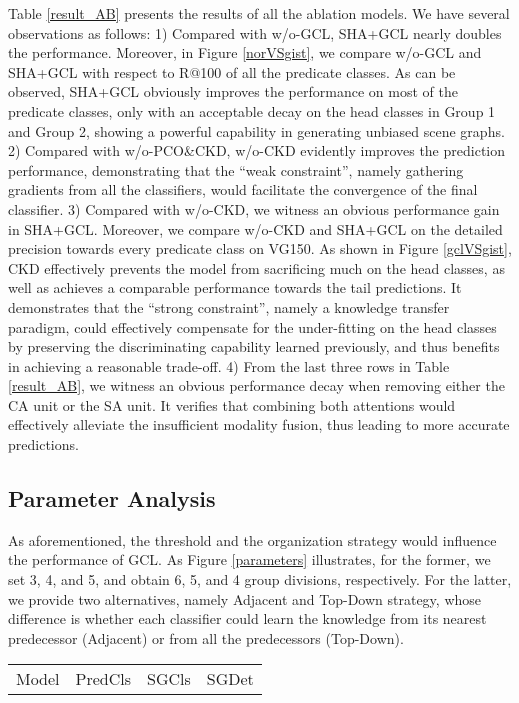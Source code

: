 \documentclass[10pt,twocolumn,letterpaper]{article}
\begin{document}
{Table \ref{result_AB} presents the results of all the ablation models. We have several observations as follows: 1) Compared with w/o-GCL, SHA+GCL nearly doubles the performance. Moreover, in Figure \ref{norVSgist}, we compare w/o-GCL and SHA+GCL with respect to R@100 of all the predicate classes. As can be observed, SHA+GCL obviously improves the performance on most of the predicate classes, only with an acceptable decay on the head classes in Group 1 and Group 2, showing a powerful capability in generating unbiased scene graphs. 2) Compared with w/o-PCO\&CKD, w/o-CKD evidently improves the prediction performance, demonstrating that the ``weak constraint'', namely gathering gradients from all the classifiers, would facilitate the convergence of the final classifier. 3) Compared with w/o-CKD, we witness an obvious performance gain in SHA+GCL. Moreover, we compare w/o-CKD and SHA+GCL on the detailed precision towards every predicate class on VG150. As shown in Figure \ref{gclVSgist}, CKD effectively prevents the model from sacrificing much on the head classes, as well as achieves a comparable performance towards the tail predictions. It demonstrates that the ``strong constraint'', namely a knowledge transfer paradigm, could effectively compensate for the under-fitting on the head classes by preserving the discriminating capability learned previously, and thus benefits in achieving a reasonable trade-off. 4) From the last three rows in Table \ref{result_AB}, we witness an obvious performance decay when removing either the CA unit or the SA unit. It verifies that combining both attentions would effectively alleviate the insufficient modality fusion, thus leading to more accurate predictions.

\subsection{Parameter Analysis}



As aforementioned, the threshold  and the organization strategy would influence the performance of GCL. As Figure \ref{parameters} illustrates, for the former, we set 3, 4, and 5, and obtain 6, 5, and 4 group divisions, respectively. For the latter, we provide two alternatives, namely Adjacent and Top-Down strategy, whose difference is whether each classifier could learn the knowledge from its nearest predecessor (Adjacent) or from all the predecessors (Top-Down).

\begin{table}
	\small
	\vspace{0.4cm}
	\begin{tabular}{p{0.4cm}<{\centering}|p{1.4cm}<{\centering}|p{1.4cm}<{\centering}|p{1.4cm}<{\centering}|p{1.4cm}<{\centering}}
		\hline
		\multicolumn{2}{c|}{Model} & \multicolumn{1}{c|}{PredCls}& \multicolumn{1}{c|}{SGCls}&\multicolumn{1}{c}{SGDet}
		\\ 
		

\end{tabular}
\end{table}}
\end{document}
